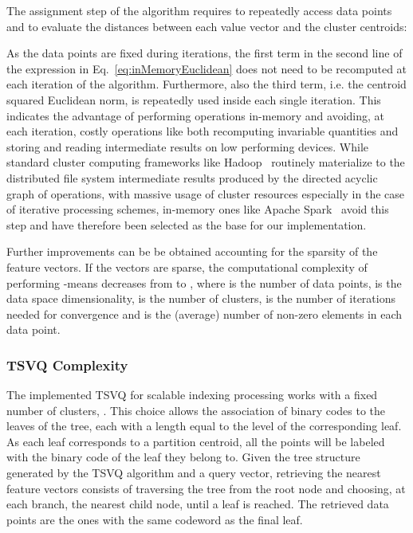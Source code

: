 The assignment step of the algorithm requires to repeatedly access data points and to evaluate the distances between each value vector and the cluster centroids:

As the data points are fixed during iterations, the first term in the second line of the expression in Eq.~\ref{eq:inMemoryEuclidean} does not need to be recomputed at each iteration of the algorithm. 
Furthermore, also the third term, i.e. the centroid squared Euclidean norm, is repeatedly used inside each single iteration. 
This indicates the advantage of performing operations in-memory and avoiding, at each iteration, costly operations like both recomputing invariable quantities and storing and reading intermediate results on low performing devices. 
While standard cluster computing frameworks like Hadoop~\cite{white2009hadoop} routinely materialize to the distributed file system intermediate results produced by the directed acyclic graph of operations, with massive usage of cluster resources especially in the case of iterative processing schemes, in-memory ones like Apache Spark~\cite{zaharia2010spark, zaharia2012resilient} avoid this step and have therefore been selected as the base for our implementation.

Further improvements can be be obtained accounting for the sparsity of the feature vectors.
If the vectors are sparse, the computational complexity of performing \mbox{-means} decreases from  to , where  is the number of data points,  is the data space dimensionality,  is the number of clusters,  is the number of iterations needed for convergence and  is the (average) number of non-zero elements in each data point.






















\subsubsection{TSVQ Complexity}
\label{sec:TSVQComplexity}
The implemented TSVQ for scalable indexing processing works with a fixed number of clusters, . This choice allows the association of binary codes to the leaves of the tree, each with a length equal to the level of the corresponding leaf. 
As each leaf corresponds to a partition centroid, all the points will be labeled with the binary code of the leaf they belong to.
Given the tree structure generated by the TSVQ algorithm and a query vector, retrieving the nearest feature vectors consists of traversing the tree from the root node and choosing, at each branch, the nearest child node, until a leaf is reached. The retrieved data points are the ones with the same codeword as the final leaf.

